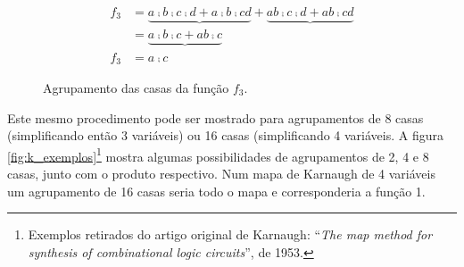 \begin{figure}[hbt]
\begin{align*}
f_3&=\underbrace{a\comp{b}\comp{c}\comp{d}+a\comp{b}\comp{c}{d}}+\underbrace{a{b}\comp{c}\comp{d}+a{b}\comp{c}{d}}\\
 &=\underbrace{a\comp{b}\comp{c}+a{b}\comp{c}}\\
 f_3&=a\comp{c}
\end{align*}
	\centering
	
\begin{center}
\end{center}
	\caption{Agrupamento das casas da função $f_3$.}
	\label{fig:k_g_simples}
\end{figure}

Este mesmo procedimento pode ser mostrado para agrupamentos de 8 casas (simplificando então 3 variáveis) ou 16 casas (simplificando 4 variáveis.
A figura \ref{fig:k_exemplos}\footnote{Exemplos retirados do artigo original de Karnaugh: ``\emph{The map method for synthesis of combinational logic circuits}'', de 1953.} mostra algumas possibilidades de agrupamentos de 2, 4 e 8 casas, junto com o produto respectivo. Num mapa de Karnaugh de 4 variáveis um agrupamento de 16 casas seria todo o mapa e corresponderia a função 1.


